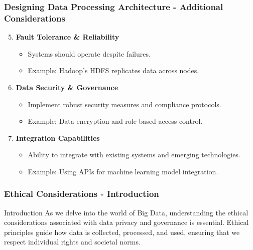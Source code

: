 \documentclass[aspectratio=169]{beamer}
\begin{document}
\begin{frame}[fragile]
    \frametitle{Designing Data Processing Architecture - Additional Considerations}
    \begin{enumerate}
        \setcounter{enumi}{4}  %
        \item \textbf{Fault Tolerance \& Reliability}
          \begin{itemize}
              \item Systems should operate despite failures.
              \item Example: Hadoop’s HDFS replicates data across nodes.
          \end{itemize}

        \item \textbf{Data Security \& Governance}
          \begin{itemize}
              \item Implement robust security measures and compliance protocols.
              \item Example: Data encryption and role-based access control.
          \end{itemize}
          
        \item \textbf{Integration Capabilities}
          \begin{itemize}
              \item Ability to integrate with existing systems and emerging technologies.
              \item Example: Using APIs for machine learning model integration.
          \end{itemize}
    \end{enumerate}
\end{frame}

\begin{frame}[fragile]
    \frametitle{Ethical Considerations - Introduction}
    \begin{block}{Introduction}
        As we delve into the world of Big Data, understanding the ethical considerations associated with data privacy and governance is essential. Ethical principles guide how data is collected, processed, and used, ensuring that we respect individual rights and societal norms.
    \end{block}
\end{frame}
\end{document}
